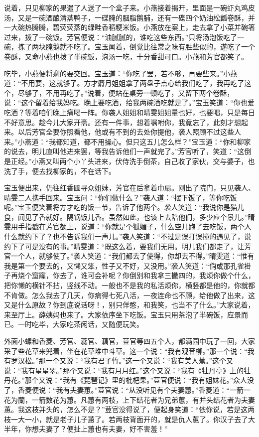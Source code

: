 \documentclass[12pt,oneside]{book}
\begin{document}
说着，只见柳家的果遣了人送了一个盒子来。小燕接着揭开，里面是一碗虾丸鸡皮汤，又是一碗酒酿清蒸鸭子，一碟腌的胭脂鹅脯，还有一碟四个奶油松瓤卷酥，并一大碗热腾腾，碧荧荧蒸的绿畦香稻粳米饭。小燕放在案上，走去拿了小菜并碗箸过来，拨了一碗饭。芳官便说：“油腻腻的，谁吃这些东西。”只将汤泡饭吃了一碗，拣了两块腌鹅就不吃了。宝玉闻着，倒觉比往常之味有胜些似的，遂吃了一个卷酥，又命小燕也拨了半碗饭，泡汤一吃，十分香甜可口。小燕和芳官都笑了。

吃毕，小燕便将剩的要交回。宝玉道：“你吃了罢，若不够，再要些来。”小燕道：“不用要，这就够了。方才麝月姐姐拿了两盘子点心给我们吃了，我再吃了这个，尽够了，不用再吃了。”说着，便站在桌旁一顿吃了，又留下两个卷酥，说：“这个留着给我妈吃。晚上要吃酒，给我两碗酒吃就是了。”宝玉笑道：“你也爱吃酒？等着咱们晚上痛喝一阵。你袭人姐姐和晴雯姐姐量也好，也要喝，只是每日不好意思。趁今儿大家开斋。还有一件事，想着嘱咐你，我竟忘了，此刻才想起来。以后芳官全要你照看他，他或有不到的去处你提他，袭人照顾不过这些人来。”小燕道：“我都知道，都不用操心。但只这五儿怎么样？”宝玉道：“你和柳家的说去，明儿直叫他进来罢，等我告诉他们一声就完了。”芳官听了，笑道：“这倒是正经。”小燕又叫两个小丫头进来，伏侍洗手倒茶，自己收了家伙，交与婆子，也洗了手，便去找柳家的，不在话下。

宝玉便出来，仍往红香圃寻众姐妹，芳官在后拿着巾扇。刚出了院门，只见袭人、晴雯二人携手回来。宝玉问：“你们做什么？”袭人道：“摆下饭了，等你吃饭呢。”宝玉便笑着将方才吃的饭一节，告诉了他两个。袭人笑道：“我说你是猫儿食，闻见了香就好。隔锅饭儿香。虽然如此，也该上去陪他们，多少应个景儿。”晴雯用手指戳在芳官额上，说道：“你就是个狐媚子，什么空儿跑了去吃饭，两个人什么就约下了？也不告诉我们一声儿。”袭人笑道：“不过是误打误撞的遇见了，说约下了可是没有的事。”晴雯道：“既这么着，要我们无用。明儿我们都走了，让芳官一个人，就够使了。”袭人笑道：“我们都去了使得，你却去不得。”晴雯道：“惟有我是第一个要去的，又懒又笨，性子又不好，又没用。”袭人笑道：“倘或那孔雀褂子再烧个窟窿，你去了，谁可会补呢？你倒别和我拿三撇四的，我烦你做个什么，把你懒的横针不拈，竖线不动。一般也不是我的私活烦你，横竖都是他的，你就都不肯做。怎么我去了几天，你病得七死八活，一夜连命也不顾，给他做了出来，这又是什么原故？你到底说话呀！，别只佯憨，和我笑，也当不了什么。”大家说着，来至厅上。薛姨妈也来了。大家依序坐下吃饭。宝玉只用茶泡了半碗饭，应景而已。一时吃毕，大家吃茶闲话，又随便玩笑。

外面小螺和香菱、芳官、蕊官、藕官，荳官等四五个人，都满园中玩了一回，大家采了些花草来兜着，坐在花草堆中斗草。这一个说：“我有观音柳。”那一个说：“我有罗汉松。”那一个又说：“我有君子竹。”这一个又说：“我有美人蕉。”这个又说：“我有星星翠。”那个又说：“我有月月红。”这个又说：“我有《牡丹亭》上的牡丹花。”那个又说：“我有《琵琶记》里的枇杷果。”荳官便说：“我有姐妹花。”众人没了，香菱便说：“我有夫妻蕙。”荳官说：“从没听见有个夫妻蕙。”香菱道：“一箭一花为蘭，一箭数花为蕙。凡蕙有两枝，上下结花者为兄弟蕙，有并头结花者为夫妻蕙。我这枝并头的，怎么不是？”荳官没得说了，便起身笑道：“依你说，若是这两枝一大一小，就是老子儿子蕙了。若两枝背面开的，就是仇人蕙了。你汉子去了大半年，你想夫妻了？便扯上蕙也有夫妻，好不害羞！”
\end{document}
